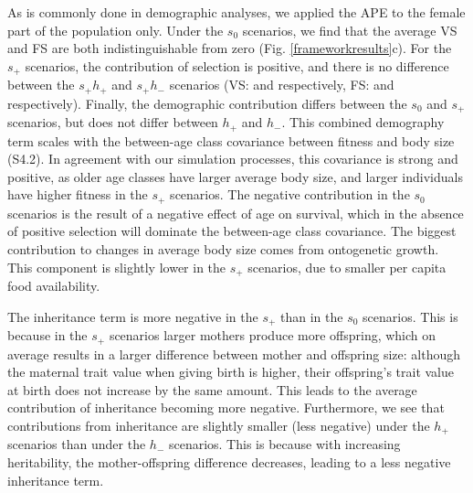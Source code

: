 As is commonly done in demographic analyses, we applied the APE to the female part of the population only. Under the $s_0$ scenarios, we find that the average VS and FS are both indistinguishable from zero (Fig. \ref{frameworkresults}c). For the $s_+$ scenarios, the contribution of selection is positive, and there is no difference between the $s_+ h_+$ and $s_+h_-$ scenarios (VS:  and  respectively, FS:  and  respectively). Finally, the demographic contribution differs between the $s_0$ and $s_+$ scenarios, but does not differ between $h_+$ and $h_-$. This combined demography term scales with the between-age class covariance between fitness and body size (S4.2). In agreement with our simulation processes, this covariance is strong and positive, as older age classes have larger average body size, and larger individuals have higher fitness in the $s_+$ scenarios. The negative contribution in the $s_0$ scenarios is the result of a negative effect of age on survival, which in the absence of positive selection will dominate the between-age class covariance. The biggest contribution to changes in average body size comes from ontogenetic growth. This component is slightly lower in the $s_+$ scenarios, due to smaller per capita food availability.

The inheritance term is more negative in the $s_+$ than in the $s_0$ scenarios. This is because in the $s_+$ scenarios larger mothers produce more offspring, which on average results in a larger difference between mother and offspring size: although the maternal trait value when giving birth is higher, their offspring's trait value at birth does not increase by the same amount. This leads to the average contribution of inheritance becoming more negative. Furthermore, we see that contributions from inheritance are slightly smaller (less negative) under the $h_+$ scenarios than under the $h_-$ scenarios. This is because with increasing heritability, the mother-offspring difference decreases, leading to a less negative inheritance term.

